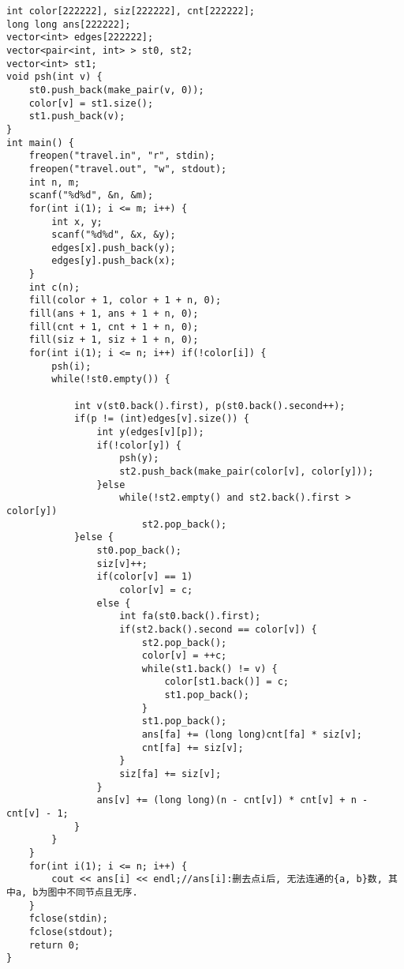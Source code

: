 \begin{lstlisting}
int color[222222], siz[222222], cnt[222222];
long long ans[222222];
vector<int> edges[222222];
vector<pair<int, int> > st0, st2;
vector<int> st1;
void psh(int v) {
	st0.push_back(make_pair(v, 0));
	color[v] = st1.size();
	st1.push_back(v);
}
int main() {
	freopen("travel.in", "r", stdin);
	freopen("travel.out", "w", stdout);
	int n, m;
	scanf("%d%d", &n, &m);
	for(int i(1); i <= m; i++) {
		int x, y;
		scanf("%d%d", &x, &y);
		edges[x].push_back(y);
		edges[y].push_back(x);
	}
	int c(n);
	fill(color + 1, color + 1 + n, 0);
	fill(ans + 1, ans + 1 + n, 0);
	fill(cnt + 1, cnt + 1 + n, 0);
	fill(siz + 1, siz + 1 + n, 0);
	for(int i(1); i <= n; i++) if(!color[i]) {
		psh(i);
		while(!st0.empty()) {
 
			int v(st0.back().first), p(st0.back().second++);
			if(p != (int)edges[v].size()) {
				int y(edges[v][p]);
				if(!color[y]) {
					psh(y);
					st2.push_back(make_pair(color[v], color[y]));
				}else
					while(!st2.empty() and st2.back().first > color[y])
						st2.pop_back();
			}else {
				st0.pop_back();
				siz[v]++;
				if(color[v] == 1) 
					color[v] = c;
				else {
					int fa(st0.back().first);
					if(st2.back().second == color[v]) {
						st2.pop_back();
						color[v] = ++c;
						while(st1.back() != v) {
							color[st1.back()] = c;
							st1.pop_back();
						}
						st1.pop_back();
						ans[fa] += (long long)cnt[fa] * siz[v];
						cnt[fa] += siz[v];
					}
					siz[fa] += siz[v];
				}
				ans[v] += (long long)(n - cnt[v]) * cnt[v] + n - cnt[v] - 1;
			}
		}
	}
	for(int i(1); i <= n; i++) {
		cout << ans[i] << endl;//ans[i]:删去点i后, 无法连通的{a, b}数, 其中a, b为图中不同节点且无序.
	}
	fclose(stdin);
	fclose(stdout);
	return 0;
}
\end{lstlisting}
